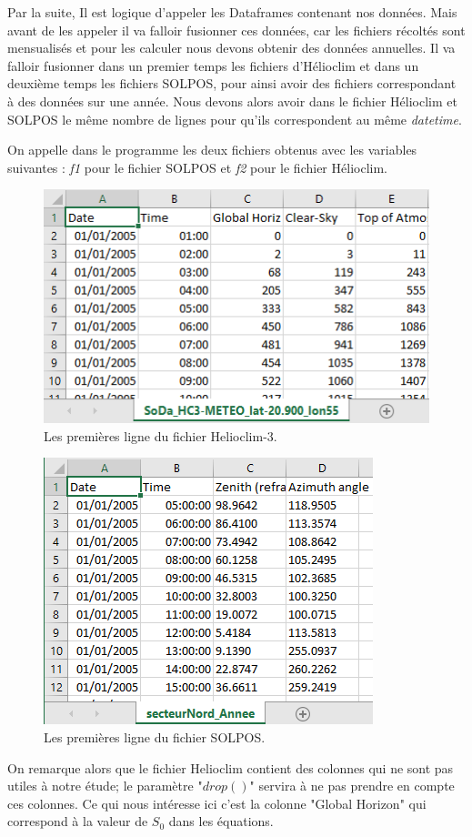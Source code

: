 \documentclass[12pt,a4paper,openright]{report}
\begin{document}
Par la suite, Il est logique d'appeler les Dataframes contenant nos données. Mais avant de les appeler il va falloir fusionner ces données, car les fichiers récoltés sont mensualisés et pour les calculer nous devons obtenir des données annuelles. Il va falloir fusionner dans un premier temps les fichiers d'Hélioclim et dans un deuxième temps les fichiers SOLPOS, pour ainsi avoir des fichiers correspondant à des données sur une année. Nous devons alors avoir dans le fichier Hélioclim et SOLPOS le même nombre de lignes pour qu'ils correspondent au même \textit{datetime}.

On appelle dans le programme les deux fichiers obtenus avec les variables suivantes : \textit{f1} pour le fichier SOLPOS et \textit{f2} pour le fichier Hélioclim.
\begin{figure}[h!]
\begin{center}
\includegraphics[scale=0.6]{tableS0}
\caption{Les premières ligne du fichier Helioclim-3.}
\end{center}
\end{figure}

\begin{figure}[h!]
\begin{center}
\includegraphics[scale=0.6]{tableAZI}
\caption{Les premières ligne du fichier SOLPOS.}
\end{center}
\end{figure}
\newpage
 On remarque alors que le fichier Helioclim contient des colonnes qui ne sont pas utiles à notre étude; le paramètre "$drop()$" servira à ne pas prendre en compte ces colonnes. Ce qui nous intéresse ici c'est la colonne "Global Horizon" qui correspond à la valeur de $S_0$ dans les équations.
\end{document}
